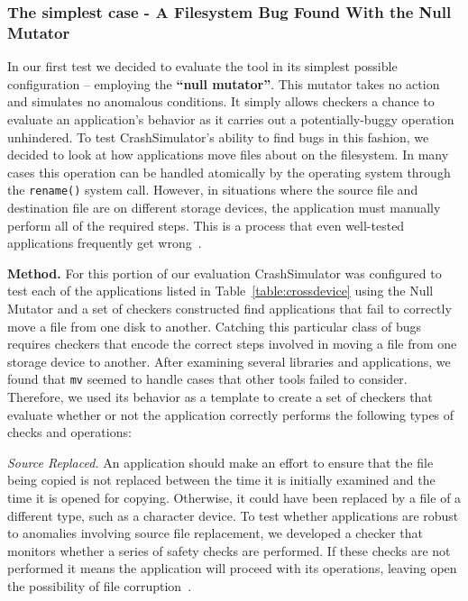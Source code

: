\subsubsection{The simplest case - A Filesystem Bug Found With the Null Mutator}

In our first test we decided to evaluate the tool in its simplest possible
configuration -- employing the {\bf ``null mutator''}.
This mutator takes no action and simulates no anomalous conditions.
It simply allows checkers
a chance to evaluate an application's behavior
as it carries out a potentially-buggy operation unhindered.
To test CrashSimulator's ability to find bugs
in this fashion, we decided to look at how applications
move files about on the filesystem.
In many cases this operation can be handled
atomically by the operating system
through the {\tt rename()} system call.
However,
in situations where the source file and destination file
are on different storage devices,
the application must
manually perform all of the required steps.
This is a process
that even well-tested applications
frequently get wrong~\cite{PHPRenameBug,PythonShutilBug,NodejsCopyBug}.

{\bf Method.}  For this portion of our evaluation
CrashSimulator was configured
to test each of the applications listed in Table~\ref{table:crossdevice}
using the Null Mutator and a set of checkers constructed find applications
that fail to correctly move a file from one disk to another.
Catching this particular class of bugs requires
checkers that encode the correct steps involved in moving a file from one
storage device to another.
After examining several libraries and applications,
we found that
{\tt mv} seemed to handle cases that other tools failed to consider.
Therefore, we
used its behavior as a template to create a set of checkers
that evaluate whether or not
the application correctly performs the following
types of checks and operations:

{\it Source Replaced.} An application should make an effort
to ensure that the file being copied
is not replaced between the time it is initially examined
and the time it is opened for copying.
Otherwise,
it could have been replaced by a file of a different type,
such as a character device.
To test whether applications are robust
to anomalies involving source file replacement,
we developed a checker that monitors whether a series of safety checks
are performed.
If these checks are not performed it
means the application will proceed with its operations,
leaving open the possibility of file corruption~\cite{PythonShutilBug}.

